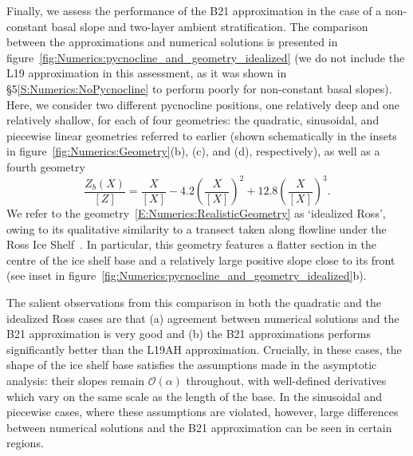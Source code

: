 \documentclass[openacc]{rsproca_new}%
\newcommand{\order}[1]{\mathcal{O}(#1)}
\begin{document}
Finally, we assess the performance of the B21 approximation in the case of a non-constant basal slope and two-layer ambient stratification. The comparison between the approximations and numerical solutions is presented in figure~\ref{fig:Numerics:pycnocline_and_geometry_idealized} (we do not include the L19 approximation in this assessment, as it was shown in \S5\ref{S:Numerics:NoPycnocline} to perform poorly for non-constant basal slopes). Here, we consider two different pycnocline positions, one relatively deep and one relatively shallow, for each of four geometries: the quadratic, sinusoidal, and piecewise linear geometries referred to earlier (shown schematically in the insets in figure~\ref{fig:Numerics:Geometry}(b), (c), and (d), respectively), as well as a fourth geometry 
\begin{equation}\label{E:Numerics:RealisticGeometry}
\frac{Z_b(X)}{\left[Z\right]}= \frac{X}{\left[X\right]} -4.2\left(\frac{X}{\left[X\right]}\right)^2 + 12.8\left(\frac{X}{\left[X\right]}\right)^3.
\end{equation}
We refer to the geometry~\eqref{E:Numerics:RealisticGeometry} as `idealized Ross', owing to its qualitative similarity to a transect taken along flowline under the Ross Ice Shelf~\citep{Shabtaie1987JGeophysResSolidEarth}. In particular, this geometry features a flatter section in the centre of the ice shelf base and a relatively large positive slope close to its front (see inset in figure~\ref{fig:Numerics:pycnocline_and_geometry_idealized}b).

The salient observations from this comparison in both the quadratic and the idealized Ross cases are that (a) agreement between numerical solutions and the B21 approximation is very good and (b) the B21 approximations performs significantly better than the L19AH approximation. Crucially, in these cases, the shape of the ice shelf base satisfies the assumptions made in the asymptotic analysis: their slopes remain $\order{\alpha}$ throughout, with well-defined derivatives which vary on the same scale as the length of the base. In the sinusoidal and piecewise cases, where these assumptions are violated, however, large differences between numerical solutions and the B21 approximation can be seen in certain regions.
\end{document}
